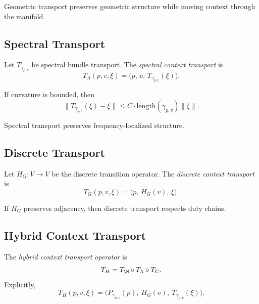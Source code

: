 \begin{remark}
Geometric transport preserves geometric structure while moving context
through the manifold.
\end{remark}

\subsection{Spectral Transport}

\begin{definition}
Let $T_{\gamma_{p,v}}$ be spectral bundle transport.  
The \emph{spectral context transport} is
\[
T_\Lambda(p,v,\xi)
= \big( p,\, v,\, T_{\gamma_{p,v}}(\xi) \big).
\]
\end{definition}

\begin{lemma}
If curvature is bounded, then
\[
\| T_{\gamma_{p,v}}(\xi) - \xi \|
\le C \cdot \mathrm{length}(\gamma_{p,v}) \|\xi\|.
\]
\end{lemma}

\begin{remark}
Spectral transport preserves frequency-localized structure.
\end{remark}

\subsection{Discrete Transport}

\begin{definition}
Let $H_G : V \to V$ be the discrete transition operator.  
The \emph{discrete context transport} is
\[
T_G(p,v,\xi)
= \big( p,\, H_G(v),\, \xi \big).
\]
\end{definition}

\begin{lemma}
If $H_G$ preserves adjacency, then discrete transport respects duty chains.
\end{lemma}

\subsection{Hybrid Context Transport}

\begin{definition}
The \emph{hybrid context transport operator} is
\[
T_H = T_\M \circ T_\Lambda \circ T_G.
\]
Explicitly,
\[
T_H(p,v,\xi)
= \big( P_{\gamma_{p,v}}(p),\ H_G(v),\ T_{\gamma_{p,v}}(\xi) \big).
\]
\end{definition}


